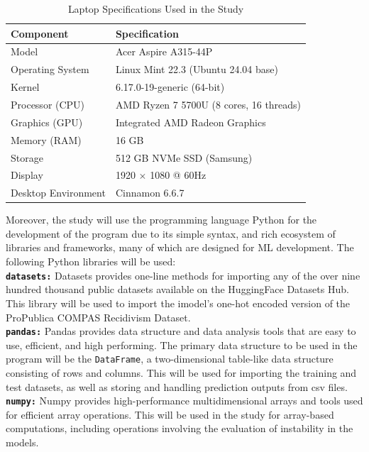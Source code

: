 \documentclass[12pt]{article}
\begin{document}
\begin{table}[h]
  \centering
  \caption{Laptop Specifications Used in the Study}
  \begin{tabular}{|l|l|}
    \hline
    \textbf{Component} & \textbf{Specification} \\ \hline
    Model & Acer Aspire A315-44P \\ \hline
    Operating System & Linux Mint 22.3 (Ubuntu 24.04 base) \\ \hline
    Kernel & 6.17.0-19-generic (64-bit) \\ \hline
    Processor (CPU) & AMD Ryzen 7 5700U (8 cores, 16 threads) \\ \hline
    Graphics (GPU) & Integrated AMD Radeon Graphics \\ \hline
    Memory (RAM) & 16 GB \\ \hline
    Storage & 512 GB NVMe SSD (Samsung) \\ \hline
    Display & 1920 $\times$ 1080 @ 60Hz \\ \hline
    Desktop Environment & Cinnamon 6.6.7 \\ \hline
  \end{tabular}
  \label{tab:laptop_specs}
\end{table}

Moreover, the study will use the programming language Python for the development of the program due to its simple syntax, and rich ecosystem of libraries and frameworks, many of which are designed for ML development. The following Python libraries will be used: \\

\textbf{\texttt{datasets:}} Datasets provides one-line methods for importing any of the over nine hundred thousand public datasets available on the HuggingFace Datasets Hub. This library will be used to import the imodel's one-hot encoded version of the ProPublica COMPAS Recidivism Dataset.\\

\textbf{\texttt{pandas:}} Pandas provides data structure and data analysis tools that are easy to use, efficient, and high performing. The primary data structure to be used in the program will be the \texttt{DataFrame}, a two-dimensional table-like data structure consisting of rows and columns. This will be used for importing the training and test datasets, as well as storing and handling prediction outputs from csv files.\\

\textbf{\texttt{numpy:}} Numpy provides high-performance multidimensional arrays and tools used for efficient array operations. This will be used in the study for array-based computations, including operations involving the evaluation of instability in the models.\\
\end{document}
